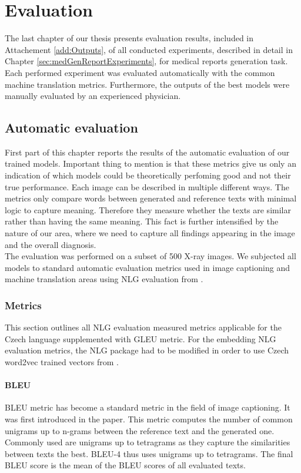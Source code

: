 \chapter{Evaluation}
The last chapter of our thesis presents evaluation results, included in Attachement \ref{add:Outputs}, of all conducted experiments, described in detail in Chapter \ref{sec:medGenReportExperiments}, for medical reports generation task. Each performed experiment was evaluated automatically with the common machine translation metrics. Furthermore, the outputs of the best models were manually evaluated by an experienced physician.

\section{Automatic evaluation}
First part of this chapter reports the results of the automatic evaluation of our trained models. Important thing to mention is that these metrics give us only an indication of which models could be theoretically perfoming good and not their true performance. Each image can be described in multiple different ways. The metrics only compare words between generated and reference texts with minimal logic to capture meaning. Therefore they measure whether the texts are similar rather than having the same meaning. This fact is further intensified by the nature of our area, where we need to capture all findings appearing in the image and the overall diagnosis. \\

The evaluation was performed on a subset of 500 X-ray images. We subjected all models to standard automatic evaluation metrics used in image captioning and machine translation areas using NLG evaluation from \citet{sharma2017nlgeval}.

\subsection{Metrics}
This section outlines all NLG evaluation measured metrics applicable for the Czech language supplemented with GLEU metric. For the embedding NLG evaluation metrics, the NLG package had to be modified in order to use Czech word2vec trained vectors from \citet{grave2018learning}.

\subsubsection*{BLEU}
BLEU metric has become a standard metric in the field of image captioning. It was first introduced in the \citet{papineni2002bleu} paper. This metric computes the number of common unigrams up to n-grams between the reference text and the generated one. Commonly used are unigrams up to tetragrams as they capture the similarities between texts the best. BLEU-4 thus uses unigrams up to tetragrams. The final BLEU score is the mean of the BLEU scores of all evaluated texts.

